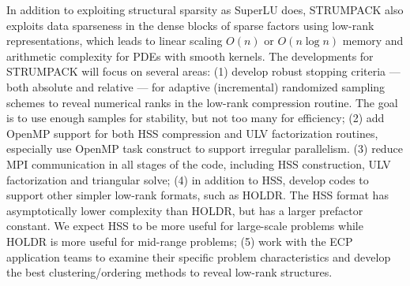 In addition to exploiting structural sparsity as SuperLU does, STRUMPACK
also exploits data sparseness in the dense blocks of sparse factors using
low-rank representations, which leads to linear scaling $O(n)$ or $O(n \log n)$
memory and arithmetic complexity for PDEs with smooth kernels.
The developments for STRUMPACK will focus on several areas:
(1) develop robust stopping criteria --- both absolute and relative --- for
    adaptive (incremental) randomized sampling schemes to reveal numerical
    ranks in the low-rank compression routine. The goal is to use
    enough samples for stability, but not too many for efficiency;
(2) add OpenMP support for both HSS compression and ULV factorization routines,
    especially use OpenMP task construct to support irregular parallelism.
(3) reduce MPI communication in all stages of the code, including HSS
    construction, ULV factorization and triangular solve;
(4) in addition to HSS, develop codes to support other simpler low-rank
    formats, such as HOLDR. The HSS format has asymptotically lower complexity
    than HOLDR, but has a larger prefactor constant. We expect HSS to be more
    useful for large-scale problems while HOLDR is more useful for mid-range
    problems;
(5) work with the ECP application teams to examine their specific problem
    characteristics and develop the best clustering/ordering methods to 
    reveal low-rank structures.

